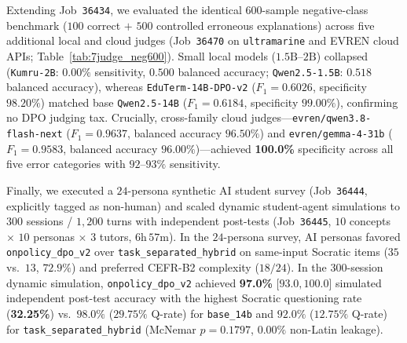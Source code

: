 \documentclass[a4paper,12pt]{report}
\begin{document}
Extending Job~\texttt{36434}, we evaluated the identical $600$-sample negative-class benchmark ($100$ correct $+$ $500$ controlled erroneous explanations) across five additional local and cloud judges (Job~\texttt{36470} on \texttt{ultramarine} and EVREN cloud APIs; Table~\ref{tab:7judge_neg600}). Small local models ($1.5\text{B}$--$2\text{B}$) collapsed (\texttt{Kumru-2B}: $0.00\%$ sensitivity, $0.500$ balanced accuracy; \texttt{Qwen2.5-1.5B}: $0.518$ balanced accuracy), whereas \texttt{EduTerm-14B-DPO-v2} ($F_1=0.6026$, specificity $98.20\%$) matched base \texttt{Qwen2.5-14B} ($F_1=0.6184$, specificity $99.00\%$), confirming no DPO judging tax. Crucially, cross-family cloud judges---\texttt{evren/qwen3.8-flash-next} ($F_1=\mathbf{0.9637}$, balanced accuracy $\mathbf{96.50\%}$) and \texttt{evren/gemma-4-31b} ($F_1=\mathbf{0.9583}$, balanced accuracy $\mathbf{96.00\%}$)---achieved \textbf{100.0\%} specificity across all five error categories with $92$--$93\%$ sensitivity.

Finally, we executed a $24$-persona synthetic AI student survey (Job~\texttt{36444}, explicitly tagged as non-human) and scaled dynamic student-agent simulations to $300$ sessions / $1{,}200$ turns with independent post-tests (Job~\texttt{36445}, $10$ concepts $\times$ $10$ personas $\times$ $3$ tutors, $6\text{h}\,57\text{m}$). In the $24$-persona survey, AI personas favored \texttt{onpolicy\_dpo\_v2} over \texttt{task\_separated\_hybrid} on same-input Socratic items ($35$ vs.\ $13$, $72.9\%$) and preferred CEFR-B2 complexity ($18/24$). In the $300$-session dynamic simulation, \texttt{onpolicy\_dpo\_v2} achieved \textbf{97.0\%} [$93.0, 100.0$] simulated independent post-test accuracy with the highest Socratic questioning rate (\textbf{32.25\%}) vs.\ $98.0\%$ ($29.75\%$ Q-rate) for \texttt{base\_14b} and $92.0\%$ ($12.75\%$ Q-rate) for \texttt{task\_separated\_hybrid} (McNemar $p=0.1797$, $0.00\%$ non-Latin leakage).
\end{document}

